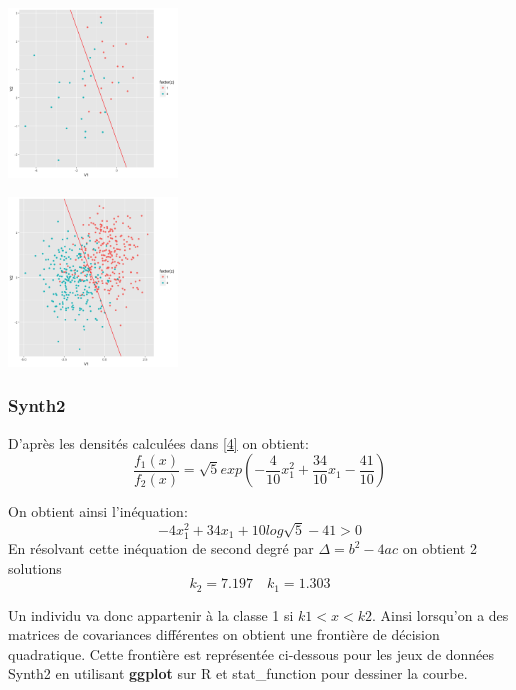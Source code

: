 \documentclass[10pt]{article}
\begin{document}
			\begin{minipage}{.5\textwidth}
	\includegraphics[width=45mm]{Figures/Exo2/linear_synth140.png}
	\label{fig:front_ceuc}
\end{minipage}%
\hspace{0.02\linewidth}
\begin{minipage}{.5\textwidth}
	\includegraphics[width=45mm]{Figures/Exo2/linear_synth1500.png}
	\label{fig:front_kppv}
\end{minipage}

\subsubsection{Synth2}
D'après les densités calculées dans \eqref{4} on obtient: \[\frac{f_{1}(x)}{f_{2}(x)} = \sqrt{5} exp(-\frac{4}{10}x_{1}^{2} + \frac{34}{10} x_{1} - \frac{41}{10})\]

On obtient ainsi l'inéquation: \[-4x_{1}^{2}  + 34x_{1} + 10log\sqrt{5} - 41 > 0\] 
En résolvant cette inéquation de second degré par $\Delta = b^{2} - 4ac$ on obtient 2 solutions
\[k_{2} = 7.197  \quad k_{1} = 1.303 \]

Un individu va donc appartenir à la classe 1 si $k1<x<k2$. Ainsi lorsqu'on a des matrices de covariances différentes on obtient une frontière de décision quadratique. Cette frontière est représentée ci-dessous pour les jeux de données Synth2 en utilisant \textbf{ggplot\textit{}} sur R et stat\_function pour dessiner la courbe.\\
\end{document}

